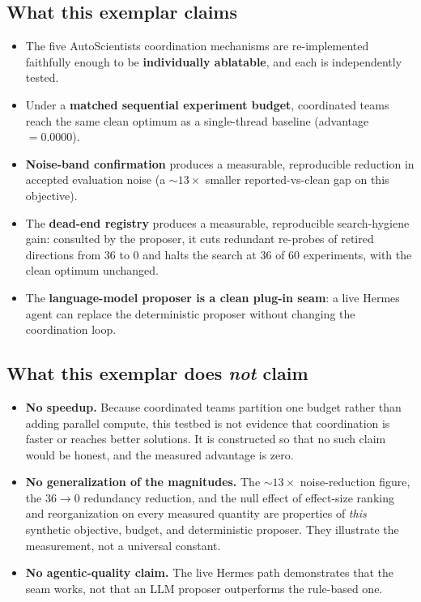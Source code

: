 \documentclass[
]{article}
\providecommand{\tightlist}{%
  \setlength{\itemsep}{0pt}\setlength{\parskip}{0pt}}
\begin{document}
\subsection{What this exemplar claims}\label{what-this-exemplar-claims}

\begin{itemize}
\tightlist
\item
  The five AutoScientists coordination mechanisms
  \citep{gao2026autoscientists} are re-implemented faithfully enough to
  be \textbf{individually ablatable}, and each is independently tested.
\item
  Under a \textbf{matched sequential experiment budget}, coordinated
  teams reach the same clean optimum as a single-thread baseline
  (advantage \(= 0.0000\)).
\item
  \textbf{Noise-band confirmation} produces a measurable, reproducible
  reduction in accepted evaluation noise (a \(\sim 13\times\) smaller
  reported-vs-clean gap on this objective).
\item
  The \textbf{dead-end registry} produces a measurable, reproducible
  search-hygiene gain: consulted by the proposer, it cuts redundant
  re-probes of retired directions from \(36\) to \(0\) and halts the
  search at \(36\) of \(60\) experiments, with the clean optimum
  unchanged.
\item
  The \textbf{language-model proposer is a clean plug-in seam}: a live
  Hermes agent can replace the deterministic proposer without changing
  the coordination loop.
\end{itemize}

\subsection{\texorpdfstring{What this exemplar does \emph{not}
claim}{What this exemplar does not claim}}\label{what-this-exemplar-does-not-claim}

\begin{itemize}
\tightlist
\item
  \textbf{No speedup.} Because coordinated teams partition one budget
  rather than adding parallel compute, this testbed is not evidence that
  coordination is faster or reaches better solutions. It is constructed
  so that no such claim would be honest, and the measured advantage is
  zero.
\item
  \textbf{No generalization of the magnitudes.} The \(\sim 13\times\)
  noise-reduction figure, the \(36 \to 0\) redundancy reduction, and the
  null effect of effect-size ranking and reorganization on every
  measured quantity are properties of \emph{this} synthetic objective,
  budget, and deterministic proposer. They illustrate the measurement,
  not a universal constant.
\item
  \textbf{No agentic-quality claim.} The live Hermes path demonstrates
  that the seam works, not that an LLM proposer outperforms the
  rule-based one.
\end{itemize}
\end{document}
